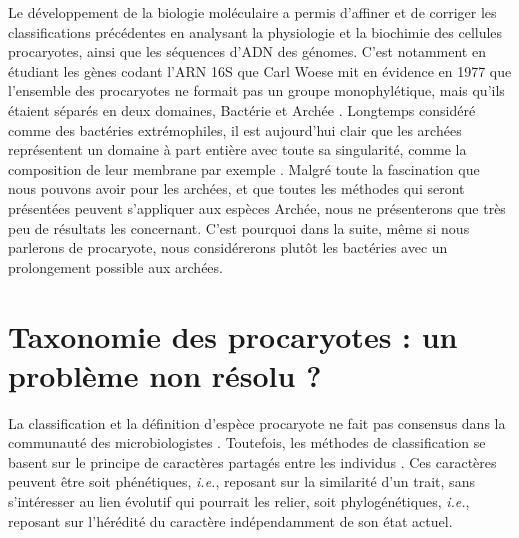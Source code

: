 \newpage

Le développement de la biologie moléculaire a permis d'affiner et de corriger les classifications précédentes en analysant la physiologie et la biochimie des cellules procaryotes, ainsi que les séquences d'ADN des génomes. C'est notamment en étudiant les gènes codant l'ARN 16S que Carl Woese mit en évidence en 1977 que l'ensemble des procaryotes ne formait pas un groupe monophylétique, mais qu'ils étaient séparés en deux domaines, Bactérie et Archée \cite{woese_phylogenetic_1977}. Longtemps considéré comme des bactéries extrémophiles, il est aujourd'hui clair que les archées représentent un domaine à part entière avec toute sa singularité, comme la composition de leur membrane par exemple \cite{albers_archaeal_2011}. Malgré toute la fascination que nous pouvons avoir pour les archées, et que toutes les méthodes qui seront présentées peuvent s'appliquer aux espèces Archée, nous ne présenterons que très peu de résultats les concernant. C'est pourquoi dans la suite, même si nous parlerons de procaryote, nous considérerons plutôt les bactéries avec un prolongement possible aux archées.

\section{Taxonomie des procaryotes : un problème non résolu ?}

La classification et la définition d'espèce procaryote ne fait pas consensus dans la communauté des microbiologistes \cite{chun_integrating_2014,adl_revisions_2019}. Toutefois, les méthodes de classification se basent sur le principe de caractères partagés entre les individus \cite{aldhebiani_species_2018}. Ces caractères peuvent être soit phénétiques, \textit{i.e.}, reposant sur la similarité d'un trait, sans s'intéresser au lien évolutif qui pourrait les relier, soit phylogénétiques, \textit{i.e.}, reposant sur l'hérédité du caractère indépendamment de son état actuel.

